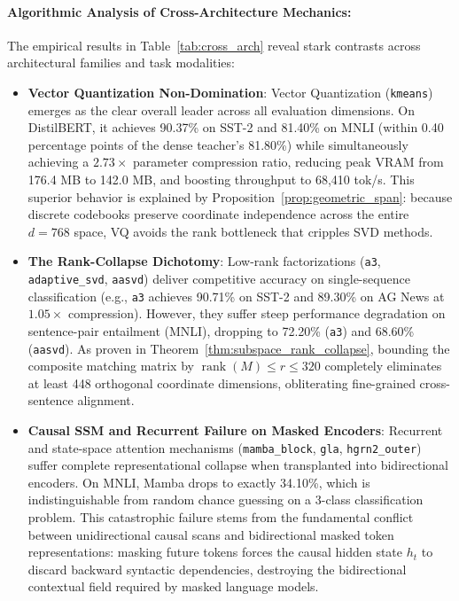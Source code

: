 \documentclass{article}
\begin{document}


\paragraph{Algorithmic Analysis of Cross-Architecture Mechanics:}
The empirical results in Table~\ref{tab:cross_arch} reveal stark contrasts across architectural families and task modalities:
\begin{itemize}
    \item \textbf{Vector Quantization Non-Domination}: Vector Quantization (\texttt{kmeans}) emerges as the clear overall leader across all evaluation dimensions. On DistilBERT, it achieves 90.37\% on SST-2 and 81.40\% on MNLI (within 0.40 percentage points of the dense teacher's 81.80\%) while simultaneously achieving a $2.73\times$ parameter compression ratio, reducing peak VRAM from 176.4 MB to 142.0 MB, and boosting throughput to 68,410 tok/s. This superior behavior is explained by Proposition~\ref{prop:geometric_span}: because discrete codebooks preserve coordinate independence across the entire $d=768$ space, VQ avoids the rank bottleneck that cripples SVD methods.
    \item \textbf{The Rank-Collapse Dichotomy}: Low-rank factorizations (\texttt{a3}, \texttt{adaptive\_svd}, \texttt{aasvd}) deliver competitive accuracy on single-sequence classification (e.g., \texttt{a3} achieves 90.71\% on SST-2 and 89.30\% on AG News at $1.05\times$ compression). However, they suffer steep performance degradation on sentence-pair entailment (MNLI), dropping to 72.20\% (\texttt{a3}) and 68.60\% (\texttt{aasvd}). As proven in Theorem~\ref{thm:subspace_rank_collapse}, bounding the composite matching matrix by $\operatorname{rank}(M) \le r \le 320$ completely eliminates at least 448 orthogonal coordinate dimensions, obliterating fine-grained cross-sentence alignment.
    \item \textbf{Causal SSM and Recurrent Failure on Masked Encoders}: Recurrent and state-space attention mechanisms (\texttt{mamba\_block}, \texttt{gla}, \texttt{hgrn2\_outer}) suffer complete representational collapse when transplanted into bidirectional encoders. On MNLI, Mamba drops to exactly 34.10\%, which is indistinguishable from random chance guessing on a 3-class classification problem. This catastrophic failure stems from the fundamental conflict between unidirectional causal scans and bidirectional masked token representations: masking future tokens forces the causal hidden state $h_t$ to discard backward syntactic dependencies, destroying the bidirectional contextual field required by masked language models.

\end{itemize}
\end{document}
